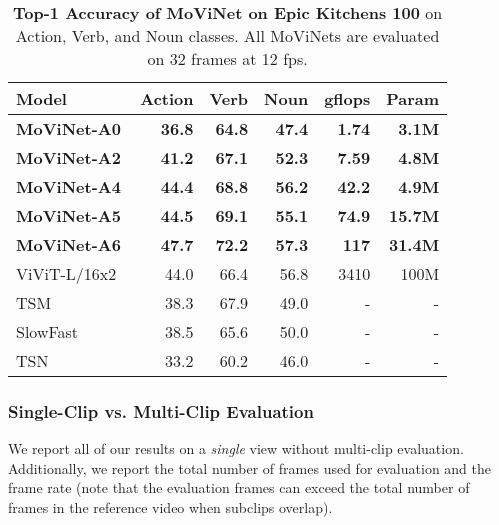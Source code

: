 \documentclass[final]{cvpr}
\newcommand{\ournet}{MoViNet\xspace} \newcommand{\ournets}{\ournet{}s\xspace}
\begin{document}
\begin{table}[tbp]
    \newcommand{\frameinput}[2]{#1#2}
    \begin{center}
\footnotesize
\begin{tabularx}{1\columnwidth}{@{}Xrrrrr@{}}
    \toprule
        \sc Model & \sc Action & \sc Verb & \sc Noun & \sc gflops & \sc Param \\
\midrule
        \bf \ournet-A0 & \bf 36.8 & \bf 64.8 & \bf 47.4 & \bf 1.74 & \bf 3.1M \\
    \midrule
        \bf \ournet-A2 & \bf 41.2 & \bf 67.1 & \bf 52.3 & \bf 7.59 & \bf 4.8M \\
    \midrule
        \bf \ournet-A4 & \bf 44.4 & \bf 68.8 & \bf 56.2 & \bf 42.2 & \bf 4.9M \\
    \midrule
        \bf \ournet-A5 & \bf 44.5 & \bf 69.1 & \bf 55.1 & \bf 74.9 & \bf 15.7M \\
    \midrule
        \bf \ournet-A6 & \bf 47.7 & \bf 72.2 & \bf 57.3 & \bf 117 & \bf 31.4M \\
        ViViT-L/16x2~\cite{arnab2021vivit} & 44.0 & 66.4 & 56.8 & 3410 & 100M \\
        TSM~\cite{lin2019tsm} & 38.3 & 67.9 & 49.0 & - & - \\
        SlowFast~\cite{feichtenhofer2019slowfast} & 38.5 & 65.6 & 50.0 & - & - \\
        TSN~\cite{wang2016temporal} & 33.2 & 60.2 & 46.0 & - & - \\
    \bottomrule
    \end{tabularx}
\end{center}
    \caption{
        {\bf Top-1 Accuracy of \ournet on Epic Kitchens 100} on Action, Verb, and Noun classes.
        All \ournets are evaluated on 32 frames at 12 fps.
    }
    \label{table:epic100-comparison}
\end{table}



\subsubsection{Single-Clip vs. Multi-Clip Evaluation}

We report all of our results on a \emph{single} view without multi-clip evaluation.
Additionally, we report the total number of frames used for evaluation and the frame rate (note that the evaluation frames can exceed the total number of frames in the reference video when subclips overlap).
\end{document}
